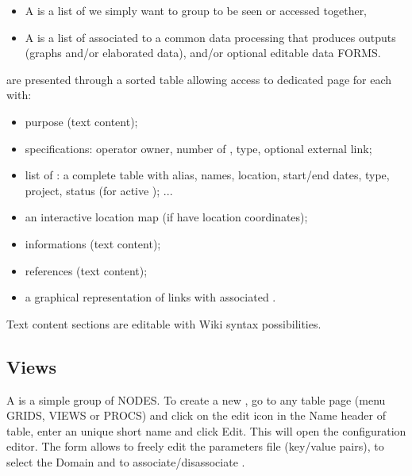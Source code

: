 \begin{itemize}
\item    A  is a list of  we simply want to group to be seen or accessed together,
\item    A  is a list of  associated to a common data processing that produces outputs (graphs and/or elaborated data), and/or optional editable data FORMS.
\end{itemize}

 are presented through a sorted table allowing access to dedicated page for each  with:
\begin{itemize}
\item    purpose (text content);
\item    specifications: operator owner, number of , type, optional external link;
\item    list of : a complete table with alias, names, location, start/end dates, type, project, status (for active ); ...
\item    an interactive location map (if  have location coordinates);
\item    informations (text content);
\item    references (text content);
\item    a graphical representation of  links with associated .
\end{itemize}

Text content sections are editable with Wiki syntax possibilities.






\subsection{Views}
\label{views}

A  is a simple group of NODES. To create a new , go to any  table page (menu GRIDS, VIEWS or PROCS) and click on the edit icon in the Name header of table, enter an unique short name and click Edit. This will open the  configuration editor. The form allows to freely edit the parameters file (key/value pairs), to select the Domain and to associate/disassociate .

